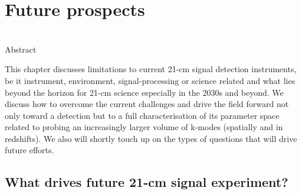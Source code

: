 \chapter{Future prospects}
\label{chapter:koopmans_bernardi}

\begin{bf}
  \author{L\'{e}on V. E. Koopmans (Kapteyn Astronomical Institute, University of Groningen),\\ Gianni Bernardi (INAF-IRA \& Rhodes University)}\\
  
Abstract\\
\end{bf}

\noindent This chapter discusses limitations to current 21-cm signal detection instruments, be it instrument, environment, signal-processing or science related and what lies beyond the horizon for 21-cm science especially in the 2030s and beyond. We discuss how to overcome the current challenges and drive the field forward not only toward a detection but to a full characterisation of its parameter space related to probing an increasingly larger volume of k-modes (spatially and in redshifts). We also will shortly touch up on the types of questions that will drive future efforts. 

\section{What drives future 21-cm signal experiment?}

